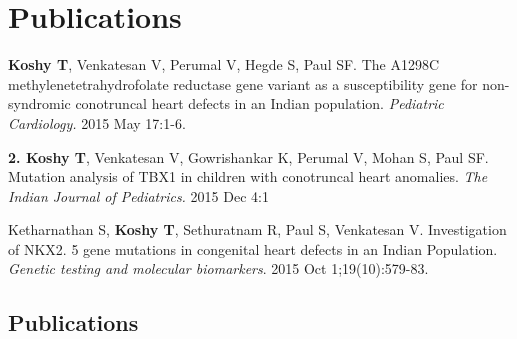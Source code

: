 \chapter{Publications}

\textbf{Koshy T}, Venkatesan V, Perumal V, Hegde S, Paul SF. The A1298C methylenetetrahydrofolate reductase gene variant as a susceptibility gene for non-syndromic conotruncal heart defects in an Indian population.
 \textit{Pediatric Cardiology.} 2015 May 17:1-6.

 

\textbf{2.	Koshy T}, Venkatesan V, Gowrishankar K, Perumal V, Mohan S, Paul SF. Mutation analysis of TBX1 in children with conotruncal heart anomalies. \textit{The Indian Journal of Pediatrics.} 2015 Dec 4:1

Ketharnathan S, \textbf{Koshy T}, Sethuratnam R, Paul S, Venkatesan V. Investigation of NKX2. 5 gene mutations in congenital heart defects in an Indian Population. \textit{Genetic testing and molecular biomarkers}. 2015 Oct 1;19(10):579-83.


\cleardoublepage

\section*{Publications}

